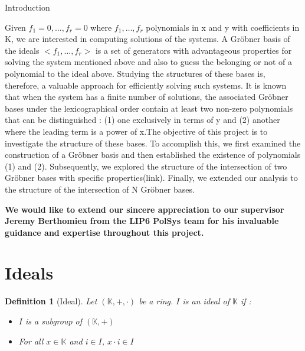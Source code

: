 \documentclass{article}
\newtheorem{definition}{Definition}[section]
\begin{document}
\begin{center}
    
\LARGE{Introduction\\}
\end{center}
Given $f_{1}=0,\dots,f_{r}=0$ where $f_{1},\dots,f_{r}$ polynomials in x and y with coefficients in K, we are interested in computing solutions of the systems. A Gröbner basis of the ideals $<f_{1},\dots,f_{r}>$ is a set of generators with advantageous properties for solving the system mentioned above and also to guess the belonging or not of a polynomial to the ideal above. Studying the structures of these bases is, therefore, a valuable approach for efficiently solving such systems. \newline
It is known that when the system has a finite number of solutions, the associated Gröbner bases under the lexicographical order contain at least two non-zero polynomials that can be distinguished : (1) one exclusively in terms of y and (2) another where the leading term is a power of x.The objective of this project is to investigate the structure of these bases.\newline
To accomplish this, we first examined the construction of a Gröbner basis and then established the existence of polynomials (1) and (2). Subsequently, we explored the structure of the intersection of two Gröbner bases with specific properties(link). Finally, we extended our analysis to the structure of the intersection of N Gröbner bases.
\newpage

\textbf{We would like to extend our sincere appreciation to our supervisor Jeremy Berthomieu from the LIP6 PolSys  team for his invaluable guidance and expertise throughout this project.}
\newpage

\tableofcontents
\newpage
      


\section{Ideals}

\begin{definition}[Ideal]
    Let $(\mathbb{K}, +, \cdot)$ be a ring. $I$ is an ideal of $\mathbb{K}$ if : 
    \begin{itemize}
        \item $I$ is a subgroup of $(\mathbb{K}, +)$
        \item For all $x \in \mathbb{K}$ and $i \in I$, $x \cdot i \in I$
    \end{itemize}
\end{definition}
\end{document}
